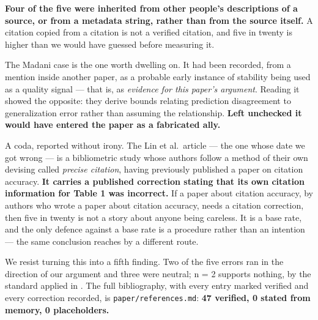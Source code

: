 \textbf{Four of the five were inherited from other people's descriptions of a source, or from a
metadata string, rather than from the source itself.} A citation copied from a citation is not
a verified citation, and five in twenty is higher than we would have guessed before measuring it.

The Madani case is the one worth dwelling on. It had been recorded, from a mention inside another
paper, as a probable early instance of stability being used as a quality signal --- that is, as
\emph{evidence for this paper's argument}. Reading it showed the opposite: they derive bounds relating
prediction disagreement to generalization error rather than assuming the relationship. \textbf{Left
unchecked it would have entered the paper as a fabricated ally.}

A coda, reported without irony. The Lin et al.~article --- the one whose date we got wrong --- is a
bibliometric study whose authors follow a method of their own devising called \emph{precise citation},
having previously published a paper on citation accuracy. \textbf{It carries a published correction
stating that its own citation information for Table 1 was incorrect.} If a paper about citation
accuracy, by authors who wrote a paper about citation accuracy, needs a citation correction, then
five in twenty is not a story about anyone being careless. It is a base rate, and the only
defence against a base rate is a procedure rather than an intention --- the same conclusion 
reaches by a different route.

We resist turning this into a fifth finding. Two of the five errors ran in the direction of our
argument and three were neutral; n = 2 supports nothing, by the standard applied in . The
full bibliography, with every entry marked verified and every correction recorded, is
\texttt{paper/references.md}: \textbf{47 verified, 0 stated from memory, 0 placeholders.}
